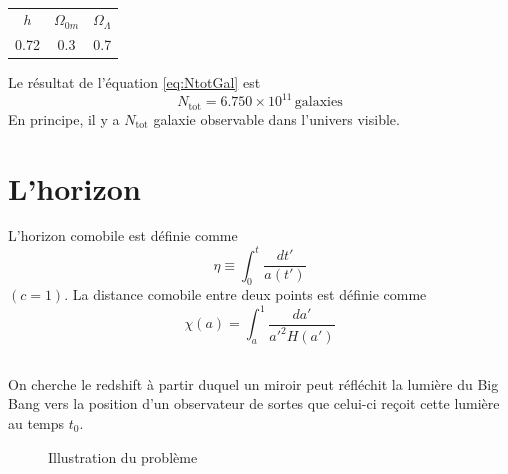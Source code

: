 \documentclass{article}
\numberwithin{equation}{section}
\begin{document}
\begin{table}[H]
        \centering
        \begin{tabular}{ccc}
                \toprule
                $h$ & $\Omega_{0m}$ & $\Omega_\Lambda$ \\
                0.72 & 0.3 & 0.7 \\
                \bottomrule
                
        \end{tabular}
        \caption{}
        \label{tab:}
\end{table}
Le résultat de l'équation \eqref{eq:NtotGal} est 
\[
        \boxed{N_{\text{tot}} = 6.750 \times 10^{11}\, \text{galaxies}}
\]
En principe, il y a $N_{\text{tot}}$ galaxie observable dans l'univers visible.


\section{L'horizon}
L'horizon comobile est définie comme
\[
        \eta \equiv \int_0^t \frac{dt'}{a(t')}
\]
$(c = 1)$. La distance comobile entre deux points est définie comme
\[
        \chi(a) = \int_a^{1} \frac{da'}{a'^2 H(a')}
\]

\subsection{}
On cherche le redshift à partir duquel un miroir peut réfléchit la lumière du Big Bang 
vers la position d'un observateur de sortes que celui-ci reçoit cette lumière au temps 
$t_0$.
\begin{figure}[H]
        \centering
        \caption{Illustration du problème}
        \label{fig:Numero2a}
\end{figure}
\end{document}
